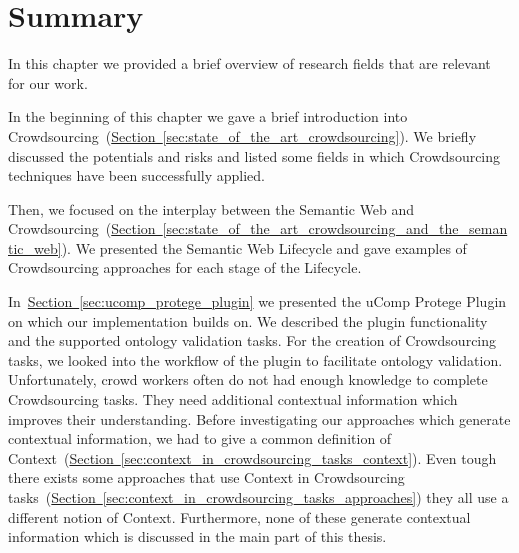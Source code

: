 \section{Summary}\label{sec:state_of_the_art_summary}
In this chapter we provided a brief overview of research fields that are relevant for our work.

In the beginning of this chapter we gave a brief introduction into Crowdsourcing~(\hyperref[sec:state_of_the_art_crowdsourcing]{Section~\ref*{sec:state_of_the_art_crowdsourcing}}). We briefly discussed the potentials and risks and listed some fields in which Crowdsourcing techniques have been successfully applied. 

Then, we focused on the interplay between the Semantic Web and Crowdsourcing~(\hyperref[sec:state_of_the_art_crowdsourcing_and_the_semantic_web]{Section~\ref*{sec:state_of_the_art_crowdsourcing_and_the_semantic_web}}). We presented the Semantic Web Lifecycle and gave examples of Crowdsourcing approaches for each stage of the Lifecycle. 

In~\hyperref[sec:ucomp_protege_plugin]{Section~\ref*{sec:ucomp_protege_plugin}} we presented the uComp Protege Plugin on which our implementation builds on. We described the plugin functionality and the supported ontology validation tasks. For the creation of Crowdsourcing tasks, we looked into the workflow of the plugin to facilitate ontology validation. 
Unfortunately, crowd workers often do not had enough knowledge to complete Crowdsourcing tasks. They need additional contextual information which improves their understanding. Before investigating our approaches which generate contextual information, we had to give a common definition of \guillemotright Context\guillemotleft~(\hyperref[sec:context_in_crowdsourcing_tasks_context]{Section~\ref*{sec:context_in_crowdsourcing_tasks_context}}). 
Even tough there exists some approaches that use Context in Crowdsourcing tasks~(\hyperref[sec:context_in_crowdsourcing_tasks_approaches]{Section~\ref*{sec:context_in_crowdsourcing_tasks_approaches}})
they all use a different notion of Context. Furthermore, none of these generate contextual information which is discussed in the main part of this thesis. 

